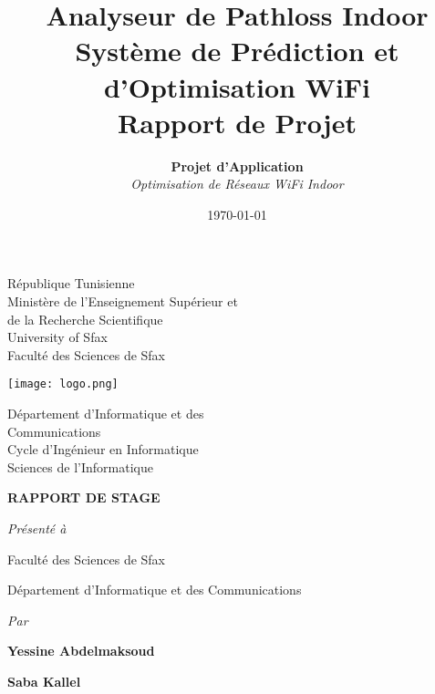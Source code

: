 \documentclass[12pt,a4paper]{article}
\title{
    \huge\textbf{Analyseur de Pathloss Indoor} \\
    \vspace{0.5cm}
    \Large Système de Prédiction et d'Optimisation WiFi \\
    \vspace{0.5cm}
    \large Rapport de Projet
}
\author{
    \textbf{Projet d'Application} \\
    \textit{Optimisation de Réseaux WiFi Indoor}
}
\date{\today}
\begin{document}
\begin{titlepage}
    \centering
    
    \begin{minipage}[t]{0.3\textwidth}
        \centering
        \small
        République Tunisienne\\
        Ministère de l'Enseignement Supérieur et\\
        de la Recherche Scientifique\\
        \vspace{0.3cm}
        University of Sfax\\
        Faculté des Sciences de Sfax
    \end{minipage}
    \hfill
    \begin{minipage}[t]{0.2\textwidth}
        \centering
        \vspace{-0.5cm} %
        \texttt{[image: logo.png]}
        \vspace{-0.5cm}
    \end{minipage}
    \hfill
    \begin{minipage}[t]{0.3\textwidth}
        \centering
        \small
        Département d'Informatique et des\\
        Communications\\
        \vspace{0.3cm}
        Cycle d'Ingénieur en Informatique\\
        Sciences de l'Informatique
    \end{minipage}
    
    \vspace{3cm}
    
    {\Huge\textbf{RAPPORT DE STAGE}}
    
    \vspace{1cm}
    
    {\large\textit{Présenté à}}
    
    {\large Faculté des Sciences de Sfax}
    
    {\large Département d'Informatique et des Communications}
    
    \vspace{1cm}
    
    {\large\textit{Par}}
    
    {\large\textbf{Yessine Abdelmaksoud}}
    
    {\large\textbf{Saba Kallel}}
    

\end{titlepage}
\end{document}

